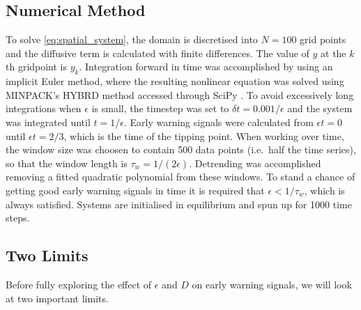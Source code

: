 \subsection{Numerical Method}
To solve \cref{eq:spatial_system}, the domain is discretised into $N = 100$ grid
points and 
the diffusive term is calculated with finite differences. The value of $y$ at the $k$th gridpoint is $y_k$. Integration forward in time was accomplished by 
using an implicit Euler method, where the resulting nonlinear equation was solved using 
MINPACK's HYBRD method accessed through SciPy \parencite{Virtanen2020}. To avoid excessively long integrations when $\epsilon$ is small,
the timestep was set to $\delta t = 0.001/\epsilon$ and the system was integrated until $t=1/\epsilon$. Early warning signals were calculated
from $\epsilon t=0$ until $\epsilon t=2/3$, which is the 
time of the tipping point. When working over time, the window size was choosen to 
contain 500 data points (i.e.\ half the time series),
so that the window length is $\tau_w = 1/(2\epsilon)$. Detrending was accomplished removing a fitted quadratic polynomial from these windows.
To stand a chance of getting good early warning
signals in time it is required that $\epsilon < 1/\tau_w$, which is always satisfied.
Systems are initialised in equilibrium and spun up for 1000 time steps.
\subsection{Two Limits}
Before fully exploring the effect of $\epsilon$ and $D$ on early warning signals, we will look at two important limits.    
